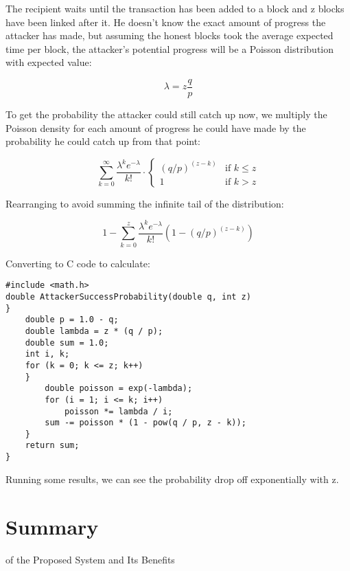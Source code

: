 \documentclass{article}
\begin{document}
{The recipient waits until the transaction has been added to a block and z blocks have been linked after it. He doesn't know the exact amount of progress the attacker has made, but assuming the honest blocks took the average expected time per block, the attacker's potential progress will be a Poisson distribution with expected value:

\begin{equation}
\lambda = z \frac{q}{p}
\end{equation}

To get the probability the attacker could still catch up now, we multiply the Poisson density for each amount of progress he could have made by the probability he could catch up from that point:

\begin{equation}
\sum_{k=0}^{\infty} \frac{\lambda^k e^{-\lambda}}{k!} \cdot
\begin{cases}
(q/p)^{(z-k)} & \text{if } k \leq z \\
1 & \text{if } k > z
\end{cases}

\end{equation}

Rearranging to avoid summing the infinite tail of the distribution:

\begin{equation}
1 - \sum_{k=0}^{z} \frac{\lambda^k e^{-\lambda}}{k!} \left(1-(q/p)^{(z-k)}\right)
\end{equation}

Converting to C code to calculate:

\begin{verbatim}
#include <math.h>
double AttackerSuccessProbability(double q, int z)
}
    double p = 1.0 - q;
    double lambda = z * (q / p);
    double sum = 1.0;
    int i, k;
    for (k = 0; k <= z; k++)
    }
        double poisson = exp(-lambda);
        for (i = 1; i <= k; i++)
            poisson *= lambda / i;
        sum -= poisson * (1 - pow(q / p, z - k));
    }
    return sum;
}
\end{verbatim}

Running some results, we can see the probability drop off exponentially with z.

\section*{Summary} of the Proposed System and Its Benefits

}
\end{document}
